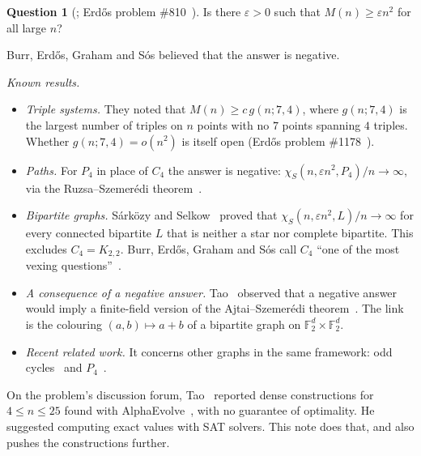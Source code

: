 \documentclass[11pt]{amsart}
\theoremstyle{definition}
\newtheorem{question}[theorem]{Question}
\newcommand{\M}{M}
\begin{document}
\begin{question}[{\cite[p.~273]{BEGS89}; Erd\H{o}s problem \#810~\cite{EP810}}]
Is there $\varepsilon>0$ such that $\M(n)\ge\varepsilon n^2$ for all large $n$?
\end{question}

Burr, Erd\H{o}s, Graham and S\'os believed that the answer is negative.

\emph{Known results.}
\begin{itemize}
\item \emph{Triple systems.} They noted that $\M(n)\ge c\,g(n;7,4)$, where $g(n;7,4)$ is the
  largest number of triples on $n$ points with no $7$ points spanning $4$ triples. Whether
  $g(n;7,4)=o(n^2)$ is itself open (Erd\H{o}s problem \#1178~\cite{EP1178}).
\item \emph{Paths.} For $P_4$ in place of $C_4$ the answer is negative:
  $\chi_S(n,\varepsilon n^2,P_4)/n\to\infty$, via the Ruzsa--Szemer\'edi
  theorem~\cite{RS78}.
\item \emph{Bipartite graphs.} Sárközy and Selkow~\cite{SS06} proved that
  $\chi_S(n,\varepsilon n^2,L)/n\to\infty$ for every connected bipartite $L$ that is neither a
  star nor complete bipartite. This excludes $C_4=K_{2,2}$. Burr, Erd\H{o}s, Graham and S\'os
  call $C_4$ ``one of the most vexing questions''~\cite{BEGS89}.
\item \emph{A consequence of a negative answer.} Tao~\cite{TaoForum} observed that a negative
  answer would imply a finite-field version of the Ajtai--Szemer\'edi theorem~\cite{AS74}. The
  link is the colouring $(a,b)\mapsto a+b$ of a bipartite graph on
  $\mathbb F_2^d\times\mathbb F_2^d$.
\item \emph{Recent related work.} It concerns other graphs in the same framework: odd
  cycles~\cite{BCM26} and $P_4$~\cite{Yang26}.
\end{itemize}

On the problem's discussion forum, Tao~\cite{TaoAE} reported dense constructions for
$4\le n\le 25$ found with AlphaEvolve~\cite{AE25}, with no guarantee of optimality. He
suggested computing exact values with SAT solvers. This note does that, and also pushes the
constructions further.
\end{document}
